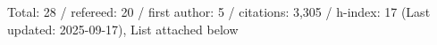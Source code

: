 Total: 28 / refereed: 20 / first author: 5 / citations: 3,305 / h-index: 17 (Last updated: 2025-09-17), List attached below